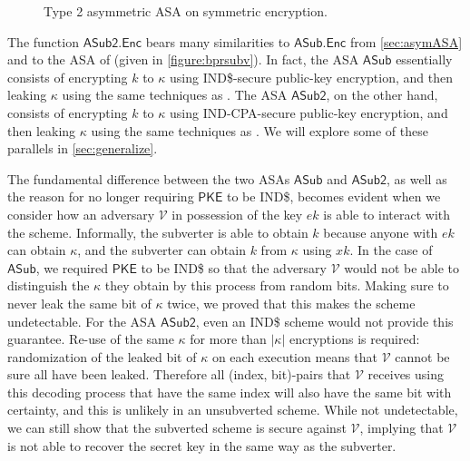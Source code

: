 \begin{wrapfigure}{R}{0.4\textwidth}
\centering
{}
\caption[Type 2 asymmetric ASA on symmetric encryption]{Type 2 asymmetric ASA on symmetric encryption.}
\label{figure:asymsubv2}
\end{wrapfigure}

The function $\mathsf{ASub2.Enc}$ bears many similarities to $\mathsf{ASub.Enc}$ from \autoref{sec:asymASA} and to the ASA of \cite{CCS:BelJaeKan15} (given in \autoref{figure:bprsubv}). In fact, the ASA $\mathsf{ASub}$ essentially consists of encrypting $k$ to $\kappa$ using IND\$-secure public-key encryption, and then leaking $\kappa$ using the same techniques as \cite{C:BelPatRog14}. The ASA $\mathsf{ASub2}$, on the other hand, consists of encrypting $k$ to $\kappa$ using IND-CPA-secure public-key encryption, and then leaking $\kappa$ using the same techniques as \cite{CCS:BelJaeKan15}. We will explore some of these parallels in \autoref{sec:generalize}.

The fundamental difference between the two ASAs $\mathsf{ASub}$ and $\mathsf{ASub2}$, as well as the reason for no longer requiring $\mathsf{PKE}$ to be IND\$, becomes evident when we consider how an adversary $\mathcal{V}$ in possession of the key $ek$ is able to interact with the scheme. Informally, the subverter is able to obtain $k$ because anyone with $ek$ can obtain $\kappa$, and the subverter can obtain $k$ from $\kappa$ using $xk$. In the case of $\mathsf{ASub}$, we required $\mathsf{PKE}$ to be IND\$ so that the adversary $\mathcal{V}$ would not be able to distinguish the $\kappa$ they obtain by this process from random bits. Making sure to never leak the same bit of $\kappa$ twice, we proved that this makes the scheme undetectable. For the ASA $\mathsf{ASub2}$, even an IND\$ scheme would not provide this guarantee. Re-use of the same $\kappa$ for more than $|\kappa|$ encryptions is required: randomization of the leaked bit of $\kappa$ on each execution means that $\mathcal{V}$ cannot be sure all have been leaked. Therefore all (index, bit)-pairs that $\mathcal{V}$ receives using this decoding process that have the same index will also have the same bit with certainty, and this is unlikely in an unsubverted scheme. While not undetectable, we can still show that the subverted scheme is secure against $\mathcal{V}$, implying that $\mathcal{V}$ is not able to recover the secret key in the same way as the subverter.

